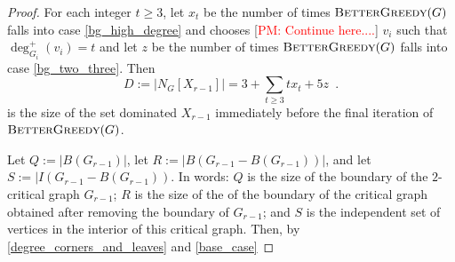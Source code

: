 \documentclass[12pt]{article}
\theoremstyle{definition}
\newcommand{\pat}[1]{[\textcolor{red}{PM: #1}]}
\begin{document}
\begin{proof}
  For each integer $t\ge 3$, let $x_t$ be the number of times $\textsc{BetterGreedy}(G)$ falls into case \cref{bg_high_degree} and chooses
  \pat{Continue here....} $v_i$ such that $\deg^+_{G_i}(v_i)=t$ and let $z$ be the number of times $\textsc{BetterGreedy}(G)$ falls into case \cref{bg_two_three}.  Then
  \[
     D:=\left|N_G[X_{r-1}]\right| = 3 + \sum_{t\ge 3}tx_t + 5z \enspace .
  \]
  is the size of the set dominated $X_{r-1}$ immediately before the final iteration of $\textsc{BetterGreedy}(G)$.

  Let $Q:=|B(G_{r-1})|$, let $R:=|B(G_{r-1}-B(G_{r-1}))|$, and let $S:=|I(G_{r-1}-B(G_{r-1}))$.  In words: $Q$ is the size of the boundary of the $2$-critical graph $G_{r-1}$; $R$ is the size of the of the boundary of the critical graph obtained after removing the boundary of $G_{r-1}$; and $S$ is the independent set of vertices in the interior of this critical graph.
  Then, by \cref{degree_corners_and_leaves} and \cref{base_case}


\end{proof}
\end{document}
